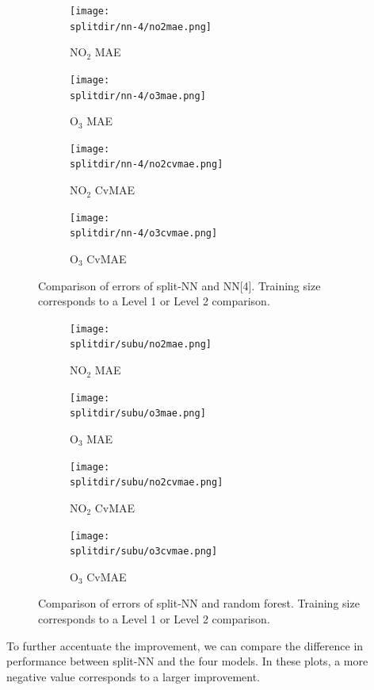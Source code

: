 \documentclass[journal abbreviation, manuscript]{copernicus}
\newcommand{\textus}[1]{$_{\text{#1}}$}
\begin{document}
\begin{figure}[H]
\begin{subfigure}{0.49\textwidth}
\texttt{[image: \\splitdir/nn-4/no2mae.png]}
\caption{NO\textus{2} MAE}
\end{subfigure}
\begin{subfigure}{0.49\textwidth}
\texttt{[image: \\splitdir/nn-4/o3mae.png]}
\caption{O\textus{3} MAE}
\end{subfigure}
\begin{subfigure}{0.49\textwidth}
\texttt{[image: \\splitdir/nn-4/no2cvmae.png]}
\caption{NO\textus{2} CvMAE}
\end{subfigure}
\begin{subfigure}{0.49\textwidth}
\texttt{[image: \\splitdir/nn-4/o3cvmae.png]}
\caption{O\textus{3} CvMAE}
\end{subfigure}
\caption{Comparison of errors of split-NN and NN[4]. Training size corresponds to a Level 1 or Level 2 comparison.}
\end{figure}

\begin{figure}[H]
\begin{subfigure}{0.49\textwidth}
\texttt{[image: \\splitdir/subu/no2mae.png]}
\caption{NO\textus{2} MAE}
\end{subfigure}
\begin{subfigure}{0.49\textwidth}
\texttt{[image: \\splitdir/subu/o3mae.png]}
\caption{O\textus{3} MAE}
\end{subfigure}
\begin{subfigure}{0.49\textwidth}
\texttt{[image: \\splitdir/subu/no2cvmae.png]}
\caption{NO\textus{2} CvMAE}
\end{subfigure}
\begin{subfigure}{0.49\textwidth}
\texttt{[image: \\splitdir/subu/o3cvmae.png]}
\caption{O\textus{3} CvMAE}
\end{subfigure}
\caption{Comparison of errors of split-NN and random forest. Training size corresponds to a Level 1 or Level 2 comparison.}
\end{figure}

To further accentuate the improvement, we can compare
the difference in performance between split-NN and the four models. In these plots, a more negative value corresponds to a larger improvement.
\end{document}
